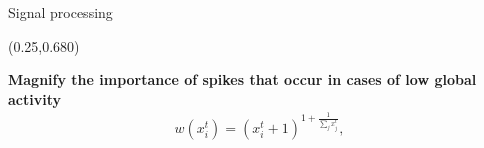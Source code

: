 \documentclass[final]{beamer}
\begin{document}
\begin{frame}{}
\begin{textblock}{0.485}
\begin{block}{Signal processing \phantom{p}}
\begin{textblock}{0.485}(0.25,0.680)
\begin{minipage}{0.48\linewidth}
\begin{shaded}
\vspace{15pt}
{\color{lightred} \textbf{Magnify the importance of spikes that occur in cases of low global activity}}
\begin{align*}
w(x^{t}_i) = (x^{t}_i + 1 )^{1 + \frac{1}{\sum_{j} x^{t}_j}},
\end{align*}\vspace{54pt}
\end{shaded}
\end{minipage}
\end{textblock}



\end{block}







\end{textblock}





 








\end{frame}
\end{document}
